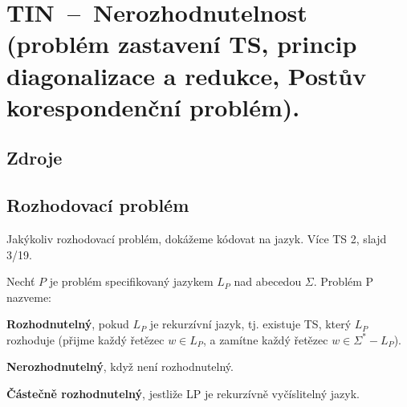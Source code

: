 

\graphicspath{{tin/nerozhodnutelnost/figures}}


\chapter{TIN~--~Nerozhodnutelnost (problém zastavení TS, princip diagonalizace a redukce, Postův korespondenční problém).}


\section{Zdroje}

\begin{compactitem}
    \item {}
    \item {}
\end{compactitem}


\section{Rozhodovací problém}

Jakýkoliv rozhodovací problém, dokážeme kódovat na jazyk. Více TS 2, slajd 3/19. 

Nechť $P$ je problém specifikovaný jazykem $L_P$ nad abecedou $\Sigma$. Problém P nazveme: \begin{compactitem}

    \item \textbf{Rozhodnutelný}, pokud $L_P$ je rekurzívní jazyk, tj. existuje TS, který $L_P$ rozhoduje (přijme každý řetězec $w \in L_P$, a zamítne každý řetězec $w \in \Sigma^* - L_P $).

    \item \textbf{Nerozhodnutelný}, když není rozhodnutelný.

    \item \textbf{Částečně rozhodnutelný}, jestliže LP je rekurzívně vyčíslitelný jazyk.

\end{compactitem}


